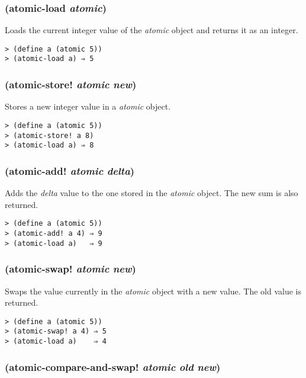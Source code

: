 \documentclass{article}
\begin{document}
\subsubsection{(atomic-load \emph{atomic})}

Loads the current integer value of the \emph{atomic} object and returns it as an integer.

\begin{verbatim}
> (define a (atomic 5))
> (atomic-load a) ⇒ 5
\end{verbatim}

\subsubsection{(atomic-store! \emph{atomic} \emph{new})}

Stores a new integer value in a \emph{atomic} object.

\begin{verbatim}
> (define a (atomic 5))
> (atomic-store! a 8)
> (atomic-load a) ⇒ 8
\end{verbatim}

\subsubsection{(atomic-add! \emph{atomic} \emph{delta})}

Adds the \emph{delta} value to the one stored in the \emph{atomic} object. The new sum is also
returned.

\begin{verbatim}
> (define a (atomic 5))
> (atomic-add! a 4) ⇒ 9
> (atomic-load a)   ⇒ 9
\end{verbatim}

\subsubsection{(atomic-swap! \emph{atomic} \emph{new})}

Swaps the value currently in the \emph{atomic} object with a new value. The old value is
returned.

\begin{verbatim}
> (define a (atomic 5))
> (atomic-swap! a 4) ⇒ 5
> (atomic-load a)    ⇒ 4
\end{verbatim}

\subsubsection{(atomic-compare-and-swap! \emph{atomic} \emph{old} \emph{new})}
\end{document}
